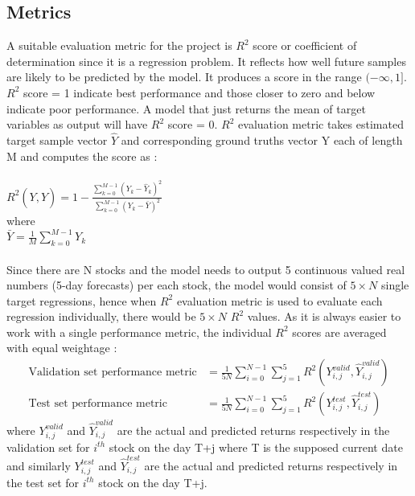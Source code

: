 \documentclass[10pt]{report}
\begin{document}
\subsection*{Metrics}
A suitable evaluation metric for the project is $R^2$ score or coefficient of determination\cite{r2score} since it is a regression problem. It reflects how well future samples are likely to be predicted by the
model. It produces a score in the range $(-\infty, 1]$. $R^2$ score = 1 indicate best performance and those closer to zero and below indicate poor performance. A model that just returns the mean of target variables as output will have $R^2$ score = 0. $R^2$ evaluation metric takes estimated target sample vector $\hat{Y}$ and corresponding ground truths vector Y each of length M and computes the score as :\\
\\
$R^2\left(Y, \hat{Y}\right) = 1 - \frac{\displaystyle\sum_{k=0}^{M-1} \left(Y_k - \hat{Y}_k\right)^2}{\displaystyle\sum_{k=0}^{M-1} \left(Y_k - \bar{Y}\right)^2}$\\
where\\
$\bar{Y} = \frac{1}{M} \displaystyle\sum_{k=0}^{M-1} Y_k$
\\
\\
Since there are N stocks and the model needs to output 5 continuous valued real numbers (5-day forecasts) per each stock, the model would consist of $5 \times N$ single target regressions, hence when $R^2$ evaluation metric is used to evaluate each regression individually, there would be $5 \times N$ $R^2$ values. As it is always easier to work with a single performance metric, the individual $R^2$ scores are averaged with equal weightage :\\
\begin{align*}
\text{Validation set performance metric} &= \frac{1}{5N} \displaystyle\sum_{i=0}^{N-1} \displaystyle\sum_{j=1}^{5} R^2\left(Y_{i,j}^{valid}, \hat{Y}_{i,j}^{valid}\right)\\
\text{Test set performance metric} &= \frac{1}{5N} \displaystyle\sum_{i=0}^{N-1} \displaystyle\sum_{j=1}^{5} R^2\left(Y_{i,j}^{test}, \hat{Y}_{i,j}^{test}\right)
\end{align*}
where $Y_{i,j}^{valid}$ and $\hat{Y}_{i,j}^{valid}$ are the actual and predicted returns respectively in the validation set for $i^{th}$ stock on the day T+j where T is the supposed current date
and similarly $Y_{i,j}^{test}$ and $\hat{Y}_{i,j}^{test}$ are the actual and predicted returns respectively in the test set for $i^{th}$ stock on the day T+j.
\end{document}
